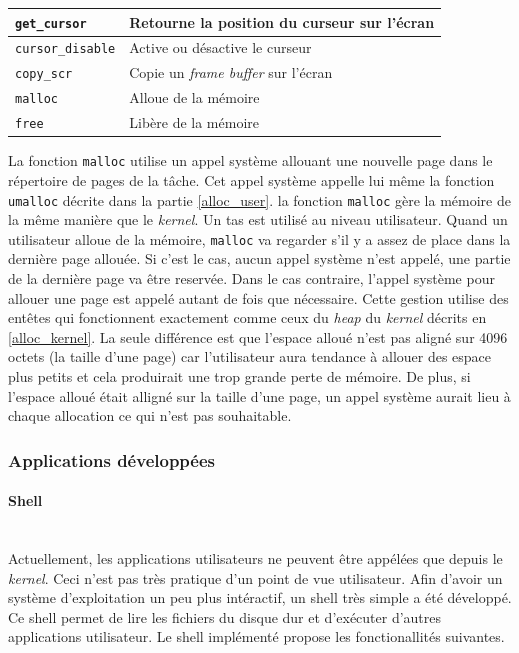 \begin{center}
{\begin{tabular}{| l | l |}
            \texttt{get_cursor} & Retourne la position du curseur sur
            l'écran \\ \hline
            \texttt{cursor_disable} & Active ou désactive le curseur \\ \hline
            \texttt{copy_scr} & Copie un \textit{frame buffer} sur
            l'écran \\ \hline
            \texttt{malloc} & Alloue de la mémoire \\ \hline
            \texttt{free} & Libère de la mémoire \\ \hline
		\end{tabular}
	}
    \label{tab:tasks:ulibc}
\end{center}

La fonction \texttt{malloc} utilise un appel système allouant une nouvelle
page dans le répertoire de pages de la tâche. Cet appel système appelle lui même
la fonction \texttt{umalloc} décrite dans la partie \ref{alloc_user}.
la fonction \texttt{malloc} gère la mémoire de la même manière que le
\textit{kernel}. Un tas est utilisé au niveau utilisateur. Quand un utilisateur
alloue de la mémoire, \texttt{malloc} va regarder s'il y a assez de
place dans la dernière page allouée. Si c'est le cas, aucun appel système n'est
appelé, une partie de la dernière page va être reservée. Dans le cas contraire,
l'appel système pour allouer une page est appelé autant de fois que nécessaire.
Cette gestion utilise des entêtes qui fonctionnent exactement comme ceux du
\textit{heap} du \textit{kernel} décrits en \ref{alloc_kernel}. La seule différence
est que l'espace alloué n'est pas aligné sur 4096 octets (la taille d'une page)
car l'utilisateur aura tendance à allouer des espace plus petits et cela produirait
une trop grande perte de mémoire. De plus, si l'espace alloué était alligné sur
la taille d'une page, un appel système aurait lieu à chaque allocation ce qui n'est
pas souhaitable.

\subsubsection{Applications développées}
\paragraph{Shell} \mbox{} \\
Actuellement, les applications utilisateurs ne peuvent être appélées que depuis
le \textit{kernel}. Ceci n'est pas très pratique d'un point de vue utilisateur.
Afin d'avoir un système d'exploitation un peu plus intéractif, un shell très
simple a été développé. Ce shell permet de lire les fichiers du disque dur et
d'exécuter d'autres applications utilisateur. Le shell implémenté propose
les fonctionallités suivantes.

